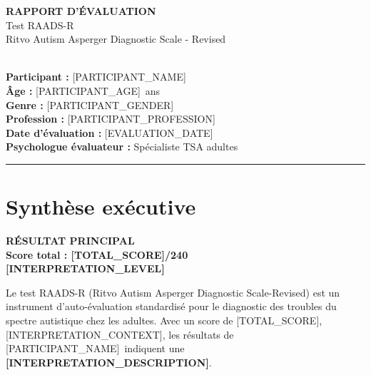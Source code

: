 \documentclass[11pt,a4paper]{article}
\newcommand{\participantName}{[PARTICIPANT_NAME]}
\newcommand{\participantAge}{[PARTICIPANT_AGE]}
\newcommand{\participantGender}{[PARTICIPANT_GENDER]}
\newcommand{\participantProfession}{[PARTICIPANT_PROFESSION]}
\newcommand{\evaluationDate}{[EVALUATION_DATE]}
\newcommand{\totalScore}{[TOTAL_SCORE]}
\newcommand{\maxTotalScore}{240}
\newcommand{\interpretationLevel}{[INTERPRETATION_LEVEL]}
\newcommand{\interpretationDescription}{[INTERPRETATION_DESCRIPTION]}
\newcommand{\reportTitle}{RAPPORT D'ÉVALUATION}
\newcommand{\testName}{Test RAADS-R}
\newcommand{\testFullName}{Ritvo Autism Asperger Diagnostic Scale - Revised}
\newcommand{\participantLabel}{Participant :}
\newcommand{\ageLabel}{Âge :}
\newcommand{\genderLabel}{Genre :}
\newcommand{\professionLabel}{Profession :}
\newcommand{\evaluationDateLabel}{Date d'évaluation :}
\newcommand{\psychologistLabel}{Psychologue évaluateur :}
\newcommand{\psychologistTitle}{Spécialiste TSA adultes}
\begin{document}
\begin{titlepage}
\centering
\vspace*{2cm}

{\Huge\bfseries\color{primary} \reportTitle}\\[0.5cm]
{\LARGE\color{secondary} \testName}\\[1cm]
{\Large \testFullName}\\[2cm]

\\[2cm]

{\Large\bfseries \participantLabel} {\Large \participantName}\\[0.5cm]
{\Large\bfseries \ageLabel} {\Large \participantAge\ ans}\\[0.5cm]
{\Large\bfseries \genderLabel} {\Large \participantGender}\\[0.5cm]
{\Large\bfseries \professionLabel} {\Large \participantProfession}\\[2cm]

{\Large\bfseries \evaluationDateLabel} {\Large \evaluationDate}\\[0.5cm]
{\Large\bfseries \psychologistLabel} {\Large \psychologistTitle}\\[3cm]

\vfill
{\color{secondary}\rule{\linewidth}{2pt}}
\end{titlepage}

\newpage

\section{Synthèse exécutive}

\begin{center}
\colorbox{accent!20}{\begin{minipage}{0.9\textwidth}
\centering
\vspace{0.5cm}
{\Large\bfseries\color{accent} RÉSULTAT PRINCIPAL}\\[0.5cm]
{\huge\bfseries Score total : \totalScore/\maxTotalScore}\\[0.3cm]
{\Large\bfseries\color{accent} \MakeUppercase{\interpretationLevel}}
\vspace{0.5cm}
\end{minipage}}
\end{center}

Le test RAADS-R (Ritvo Autism Asperger Diagnostic Scale-Revised) est un instrument d'auto-évaluation standardisé pour le diagnostic des troubles du spectre autistique chez les adultes. Avec un score de \totalScore, [INTERPRETATION_CONTEXT], les résultats de \participantName\ indiquent une \textbf{\interpretationDescription}.
\end{document}
